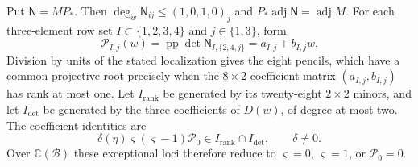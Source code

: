 \documentclass[11pt,a4paper]{article}
\numberwithin{equation}{section}
\theoremstyle{plain}
\theoremstyle{definition}
\theoremstyle{remark}
\begin{document}
Put $\mathsf N=MP_*$. Then
$\deg_w\mathsf N_{ij}\le(1,0,1,0)_j$ and
$P_*\operatorname{adj}\mathsf N=\operatorname{adj}M$.
For each three-element row set $I\subset\{1,2,3,4\}$ and
$j\in\{1,3\}$, form
\[
 \mathscr P_{I,j}(w)=\operatorname{pp}\det\mathsf N_{I,\{2,4,j\}}
           =a_{I,j}+b_{I,j}w.
\]
Division by units of the stated localization gives the eight pencils,
which
have a common projective root precisely when the $8\times2$
coefficient matrix $(a_{I,j},b_{I,j})$ has rank at most one.
Let $I_{\mathrm{rank}}$ be generated by its twenty-eight $2\times2$
minors, and let $I_{\mathrm{det}}$ be generated by the three
coefficients of $D(w)$, of degree at most two. The coefficient identities are
\[
 \delta(\eta)\varsigma(\varsigma-1)\mathcal P_0
       \in I_{\mathrm{rank}}\cap I_{\mathrm{det}},\qquad \delta\ne0.
\]
Over $\mathbb C(\mathscr B)$ these exceptional loci therefore reduce to
$\varsigma=0$, $\varsigma=1$, or $\mathcal P_0=0$.
\end{document}
